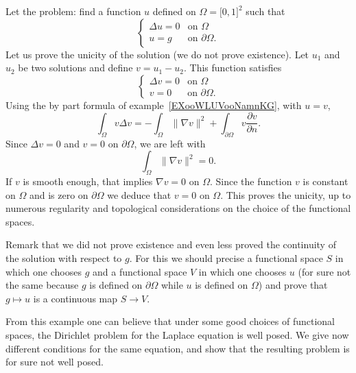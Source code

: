 \begin{example}          \label{EXooLTODooOwJtGC}
	Let the problem: find a function \( u\) defined on \( \Omega=\mathopen[ 0 , 1 \mathclose]^2\) such that
	\begin{equation}
		\begin{cases}
			\Delta u=0 & \text{on } \Omega          \\
			u=g        & \text{on } \partial\Omega.
		\end{cases}
	\end{equation}
	Let us prove the unicity of the solution (we do not prove existence). Let \( u_1\) and \( u_2\) be two solutions and define \( v=u_1-u_2\). This function satisfies
	\begin{equation}
		\begin{cases}
			\Delta v=0 & \text{on } \Omega         \\
			v=0        & \text{on }\partial\Omega.
		\end{cases}
	\end{equation}
	Using the by part formula of example~\ref{EXooWLUVooNamnKG}, with \( u=v\),
	\begin{equation}
		\int_{\Omega}v\Delta v=-\int_{\Omega}\| \nabla v \|^2+\int_{\partial\Omega}v\frac{ \partial v }{ \partial n }.
	\end{equation}
	Since \( \Delta v=0\) and \( v=0\) on \( \partial\Omega\), we are left with
	\begin{equation}
		\int_{\Omega}\| \nabla v \|^2=0.
	\end{equation}
	If \( v\) is smooth enough, that implies \( \nabla v=0\) on \( \Omega\). Since the function \( v\) is constant on \( \Omega\) and is zero on \( \partial\Omega\) we deduce that \( v=0\) on \( \Omega\). This proves the unicity, up to numerous regularity and topological considerations on the choice of the functional spaces.

	Remark that we did not prove existence and even less proved the continuity of the solution with respect to \( g\). For this we should precise a functional space \( S\) in which one chooses \( g\) and a functional space \( V\) in which one chooses \( u\) (for sure not the same because \( g\) is defined on \( \partial \Omega\) while \( u\) is defined on \( \Omega\)) and prove that \( g\mapsto u\) is a continuous map \( S\to V\).
\end{example}

From this example one can believe that under some good choices of functional spaces, the Dirichlet problem for the Laplace equation is well posed. We give now different conditions for the same equation, and show that the resulting problem is for sure not well posed.


